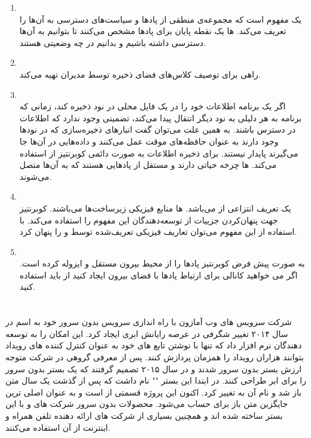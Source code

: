\begin{enumerate}
	\item
	\\
	یک مفهوم است که مجموعه‌ی منطقی از پادها و سیاست‌های دسترسی به آن‌ها را تعریف می‌کند.  ها یک نقطه پایان برای پادها مشخص می‌کنند تا بتوانیم به آن‌ها دسترسی داشته باشیم و بدانیم در چه وضعیتی هستند. 
	\item
	\\
	راهی برای توصیف کلاس‌های فضای ذخیره توسط مدیران تهیه می‌کند. 
	\item
	\\
	اگر یک برنامه اطلاعات خود را در یک فایل محلی در نود ذخیره کند، زمانی که  برنامه به هر دلیلی به نود دیگر انتقال پیدا می‌کند، تضمینی وجود ندارد که اطلاعات در دسترس باشند. به همین علت می‌توان گفت انبارهای ذخیره‌سازی که در نودها وجود دارند به عنوان حافظه‌های موقت عمل می‌کنند و داده‌هایی در آن‌ها جا می‌گیرند پایدار نیستند. برای ذخیره اطلاعات به صورت دائمی کوبرنتیز از  استفاده می‌کند.   ها چرخه حیاتی دارند و مستقل از پادهایی هستند که به آن‌ها متصل می‌شوند.
	
	\item
	\\
	یک تعریف انتزاعی از  می‌باشد.  ها منابع فیزیکی زیرساخت‌ها می‌باشند. کوبرنتیز جهت پنهان‌کردن جزییات از توسعه‌دهندگان این مفهوم را استفاده می‌کند. با استفاده از این مفهوم می‌توان تعاریف فیزیکی تعریف‌شده توسط 	و  را پنهان کرد.
	
	\item
	\\
	به صورت پیش فرض کوبرنتیز پادها را از محیط بیرون مستقل و ایزوله کرده است. اگر می خواهید کانالی برای ارتباط پادها با فضای بیرون ایجاد کنید از  باید استفاده کنید.
\end{enumerate}

\newpage

\section{}

شرکت سرویس های وب آمازون با راه اندازی سرویس بدون سرور خود به اسم  در سال ۲۰۱۴ تغییر شگرفی در عرصه رایانش ابری ایجاد کرد.  این امکان را به توسعه دهندگان نرم افزار داد که تنها با نوشتن تابع های خود به عنوان کنترل کننده های رویداد بتوانند هزاران رویداد را همزمان پردازش کنند. پس از معرفی  گروهی در شرکت  متوجه ارزش بستر بدون سرور شدند و در سال ۲۰۱۵ تصمیم گرفتند که یک بستر بدون سرور را برای ابر  طراحی کنند. در ابتدا این بستر "" نام داشت که پس از گذشت یک سال متن باز شد و نام آن به  تغییر کرد. اکنون این پروژه قسمتی از  است و به عنوان اصلی ترین جایگزین متن باز برای  حساب می‌شود. محصولات بدون سرور شرکت های  و  با این بستر ساخته شده اند و همچنین بسیاری از شرکت های ارائه دهنده تلفن همراه و اینترنت از آن استفاده می‌کنند.

